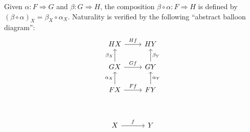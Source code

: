 \begin{definition}
  Given \(\alpha : F \Rightarrow G\) and \(\beta : G \Rightarrow H\),
  the composition \(\beta\circ \alpha : F \Rightarrow H\) is defined by
  \((\beta\circ\alpha)_{X} = \beta_X \circ \alpha_X\).
  Naturality is verified by the following ``abstract balloon diagram'':
  \[%
\begin{tikzcd}
HX \arrow[r, "Hf"]                       & HY                        \\
GX \arrow[r, "Gf"] \arrow[u, "\beta_X"]  & GY \arrow[u, "\beta_Y"']  \\
FX \arrow[r, "Ff"] \arrow[u, "\alpha_X"] & FY \arrow[u, "\alpha_Y"'] \\
                                         &                           \\
X \arrow[r, "f"]                         & Y
\end{tikzcd}\]
\end{definition}


